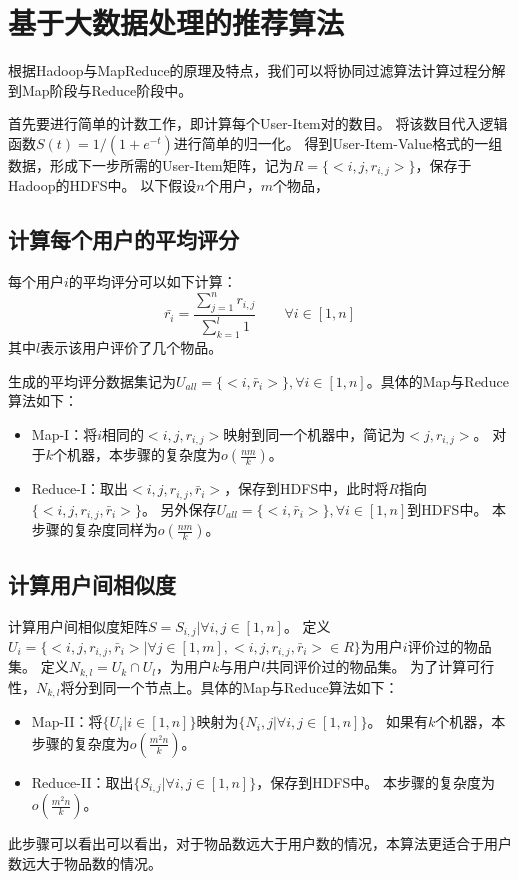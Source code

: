 \section{基于大数据处理的推荐算法}
根据Hadoop与MapReduce的原理及特点，我们可以将协同过滤算法计算过程分解到Map阶段与Reduce阶段中。

首先要进行简单的计数工作，即计算每个User-Item对的数目。
将该数目代入逻辑函数$S(t)=1/(1+e^{-t})$进行简单的归一化。
得到User-Item-Value格式的一组数据，形成下一步所需的User-Item矩阵，记为$R=\{<i,j,r_{i,j}>\}$，保存于Hadoop的HDFS中。
以下假设$n$个用户，$m$个物品，

\subsection{计算每个用户的平均评分}
每个用户$i$的平均评分可以如下计算：
\begin{equation}
\bar{r_i} = \frac{\sum_{j=1}^n r_{i,j}}{\sum_{k=1}^l 1}\qquad \forall i\in [1,n]
\end{equation}
其中$l$表示该用户评价了几个物品。

生成的平均评分数据集记为$U_{all}=\{<i,\bar{r}_i>\},\forall i\in [1,n]$。具体的Map与Reduce算法如下：
\begin{itemize}
\item Map-I：将$i$相同的$<i,j,r_{i,j}>$映射到同一个机器中，简记为$<j,r_{i,j}>$。
对于$k$个机器，本步骤的复杂度为$o(\frac{nm}{k})$。
\item Reduce-I：取出$<i,j,r_{i,j},\bar{r}_i>$，保存到HDFS中，此时将$R$指向$\{<i,j,r_{i,j},\bar{r}_i>\}$。
另外保存$U_{all}=\{<i,\bar{r}_i>\},\forall i\in [1,n]$到HDFS中。
本步骤的复杂度同样为$o(\frac{nm}{k})$。
\end{itemize}

\subsection{计算用户间相似度}
计算用户间相似度矩阵$S={S_{i,j}|\forall i,j\in[1,n]}$。
定义$U_i = \{<i,j,r_{i,j},\bar{r}_i>|\forall j \in [1,m],<i,j,r_{i,j},\bar{r}_i>\in R\}$为用户$i$评价过的物品集。
定义$N_{k,l} = U_k \cap U_l$，为用户$k$与用户$l$共同评价过的物品集。
为了计算可行性，$N_{k,l}$将分到同一个节点上。具体的Map与Reduce算法如下：
\begin{itemize}
\item Map-II：将$\{U_i|i\in [1,n]\}$映射为$\{N_i,j|\forall i,j\in [1,n]\}$。
如果有$k$个机器，本步骤的复杂度为$o(\frac{m^2n}{k})$。
\item Reduce-II：取出$\{S_{i,j}|\forall i,j\in [1,n]\}$，保存到HDFS中。
本步骤的复杂度为$o(\frac{m^2n}{k})$。
\end{itemize}
此步骤可以看出可以看出，对于物品数远大于用户数的情况，本算法更适合于用户数远大于物品数的情况。

